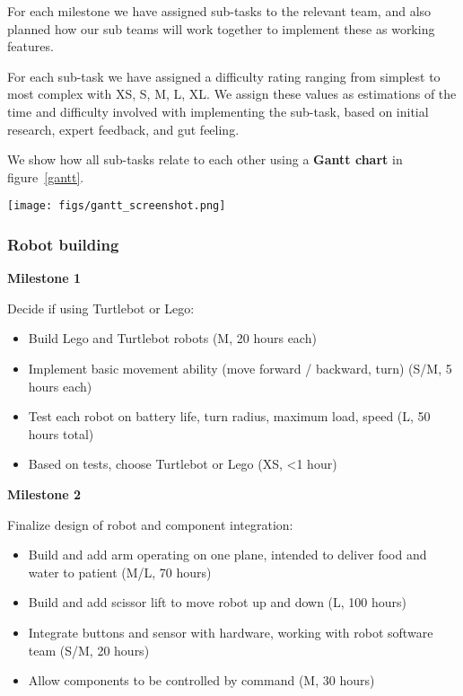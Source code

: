 \documentclass{article}
\begin{document}
For each milestone we have assigned sub-tasks to the relevant team, and also planned how our sub teams will work together to implement these as working features.

For each sub-task we have assigned a difficulty rating ranging from simplest to most complex with XS, S, M, L, XL. We assign these values as estimations of the time and difficulty involved with implementing the sub-task, based on initial research, expert feedback, and gut feeling. 

We show how all sub-tasks relate to each other using a {\bf Gantt chart} in figure~\ref{gantt}.

\begin{figure*}
  \texttt{[image: figs/gantt\_screenshot.png]}
  \caption{{\bf Gantt chart} representing dependencies between tasks and flow of tasks over time. Due to limitations in text width, tasks are represented using the shortened versions mentioned in tables~\ref{tab:rb-rd}, ~\ref{tab:rp-rd}, and ~\ref{tab:app-rd}. {\bf Milestone dates} track to the Wednesday of the demo date rather than the Sunday: work on features for a milestone is expected to finish on the Sunday but work on new features will not begin until Monday. Arrows between bars indicate key {\bf dependencies}: minor dependencies are not marked but can be seen as a bar not being started until another is finished. }
  \label{gantt}
\end{figure*}

\subsubsection{Robot building}
{\bf Milestone 1}

Decide if using Turtlebot or Lego:
\begin{itemize}
\item Build Lego and Turtlebot robots (M, 20 hours each)
\item Implement basic movement ability (move forward / backward, turn) (S/M, 5 hours each)
\item Test each robot on battery life, turn radius, maximum load, speed (L, 50 hours total)
\item Based on tests, choose Turtlebot or Lego (XS, <1 hour)
\end{itemize}

{\bf Milestone 2}

Finalize design of robot and component integration:
\begin{itemize}
\item Build and add arm operating on one plane, intended to deliver food and water to patient (M/L, 70 hours)
\item Build and add scissor lift to move robot up and down (L, 100 hours)
\item Integrate buttons and sensor with hardware, working with robot software team (S/M, 20 hours)
\item Allow components to be controlled by command (M, 30 hours)
\end{itemize}
\end{document}
